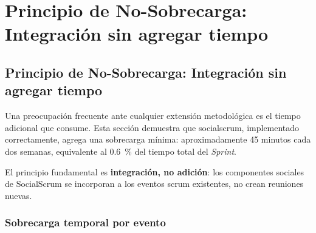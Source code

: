 \chapter{Principio de No-Sobrecarga: Integración sin agregar tiempo}
\label{anexo:principio-no-sobrecarga}

\section{Principio de No-Sobrecarga: Integración sin agregar tiempo}

Una preocupación frecuente ante cualquier extensión metodológica es el tiempo adicional que consume. Esta sección demuestra que \gls{socialscrum}, implementado correctamente, agrega una sobrecarga mínima: aproximadamente 45 minutos cada dos semanas, equivalente al 0.6~\% del tiempo total del \textit{Sprint}.

El principio fundamental es \textbf{integración, no adición}: los componentes sociales de SocialScrum se incorporan a los eventos \gls{scrum} existentes, no crean reuniones nuevas.

\subsection{Sobrecarga temporal por evento}

\begingroup
\scriptsize
\renewcommand{\arraystretch}{1.4}
\setlength{\tabcolsep}{4pt}
\setlength{\LTleft}{0pt}
\setlength{\LTright}{0pt}

